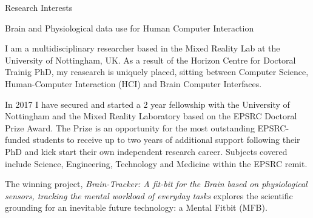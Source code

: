 \documentclass{resume} %
\begin{document}
\begin{rSection}{Research Interests}
\begin{rSubsection}{Brain and Physiological data use for Human Computer Interaction}{ }{ }{ }
\vspace{-5 mm}

I am a multidisciplinary researcher based in the Mixed Reality Lab at the University of Nottingham, UK. As a result of the Horizon Centre for Doctoral Trainig PhD, my reasearch is uniquely placed, sitting between Computer Science, Human-Computer Interaction (HCI) and Brain Computer Interfaces. 

In 2017 I have secured and started a 2 year fellowship with the University of Nottingham and the Mixed Reality Laboratory based on the EPSRC Doctoral Prize Award. The Prize is an opportunity for the most outstanding EPSRC-funded students to receive up to two years of additional support following their PhD and kick start their own independent research career. Subjects covered include Science, Engineering, Technology and Medicine within the EPSRC remit.

 The winning project, \textit{Brain-Tracker: A fit-bit for the Brain based on physiological sensors, tracking the mental workload of everyday tasks} explores the scientific grounding for an inevitable future technology: a Mental Fitbit (MFB).



\end{rSubsection}
\end{rSection}
\end{document}
